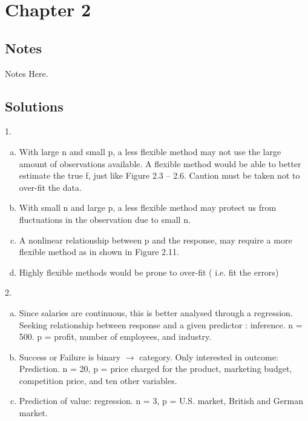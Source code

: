 \documentclass[12pt,twoside,notitlepage]{article}
\begin{document}
\section{Chapter 2}

\subsection{Notes}

Notes Here.

\subsection{Solutions}
\setdefaultleftmargin{30pt}{}{}{}{}{}
1.


\begin{enumerate}[(a)]
\setlength\itemindent{20pt}
\item With large n and small p, a less flexible method may not use the large 
  amount of observations available. A flexible method would be able to better 
  estimate the true f, just like Figure 2.3 -- 2.6. Caution must be taken not 
  to over-fit the data.
\item With small n and large p, a less flexible method may protect us from 
fluctuations in the observation due to small n. 
\item A nonlinear relationship between p and the response, may require a more 
  flexible method as in shown in Figure 2.11.
\item Highly flexible methods would be prone to over-fit ( i.e. fit the errors) 
\end{enumerate}
\setlength\itemindent{0pt}
2.
\begin{enumerate}[(a)]
\setlength\itemindent{20pt}
\item Since salaries are continuous, this is better analysed through a regression.
Seeking relationship between response and a given predictor : inference.  
n = 500. p = profit, number of employees, and industry.
\item Success or Failure is binary $\rightarrow$ category. Only interested in 
  outcome: Prediction. n = 20, p = price charged for the product, marketing 
  budget, competition price, and ten other variables.
\item Prediction of value: regression.  n = 3, p = U.S. market, British and German
  market.
\end{enumerate}  
\end{document}
